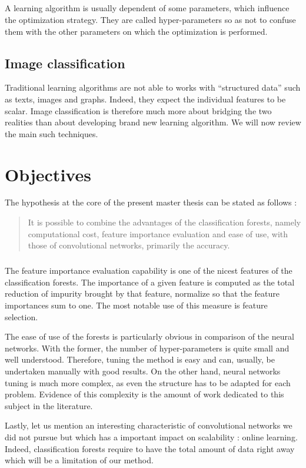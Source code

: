 \documentclass[a4paper]{report}
\begin{document}
\paragraph{}
A learning algorithm is usually dependent of some parameters, which influence the optimization strategy. They are called hyper-parameters so as not to confuse them with the other parameters on which the optimization is performed.

\section{Image classification}
Traditional learning algorithms are not able to works with ``structured data'' such as texts, images and graphs. Indeed, they expect the individual features to be scalar. Image classification is therefore much more about bridging the two realities than about developing brand new learning algorithm. We will now review the main such techniques.

\chapter{Objectives}
The hypothesis at the core of the present master thesis can be stated as follows : 
\begin{quote}
It is possible to combine the advantages of the classification forests, namely computational cost, feature importance evaluation and ease of use, with those of convolutional networks, primarily the accuracy.
\end{quote}
\paragraph{}
The feature importance evaluation capability is one of the nicest features of the classification forests. The importance of a given feature is computed as the total reduction of impurity brought by that feature, normalize so that the feature importances sum to one. The most notable use of this measure is feature selection. 
\par
The ease of use of the forests is particularly obvious in comparison of the neural networks. With the former, the number of hyper-parameters is quite small and well understood. Therefore, tuning the method is easy and can, usually, be undertaken manually with good results. On the other hand, neural networks tuning is much more complex, as even the structure has to be adapted for each problem. Evidence of this complexity is the amount of work dedicated to this subject in the literature. %
\par
Lastly, let us mention an interesting characteristic of convolutional networks we did not pursue but which has a important impact on scalability : online learning. Indeed, classification forests require to have the total amount of data right away which will be a limitation of our method.
\end{document}
